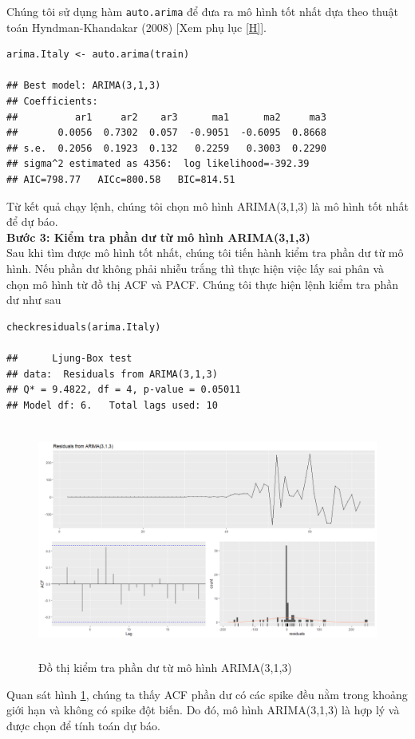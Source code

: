 \documentclass[12pt, a4paper,oneside]{book}
\theoremstyle{definition}
\begin{document}
Chúng tôi sử dụng hàm \lstinline{auto.arima} để đưa ra mô hình tốt nhất dựa theo thuật toán Hyndman-Khandakar (2008) [Xem phụ lục \ref{H}].
\begin{lstlisting}
arima.Italy <- auto.arima(train)

## Best model: ARIMA(3,1,3) 
## Coefficients:
##          ar1     ar2    ar3      ma1      ma2     ma3
##       0.0056  0.7302  0.057  -0.9051  -0.6095  0.8668
## s.e.  0.2056  0.1923  0.132   0.2259   0.3003  0.2290
## sigma^2 estimated as 4356:  log likelihood=-392.39
## AIC=798.77   AICc=800.58   BIC=814.51
\end{lstlisting}
Từ kết quả chạy lệnh, chúng tôi chọn mô hình ARIMA(3,1,3) là mô hình tốt nhất để dự báo.\\
\textbf{Bước 3: Kiểm tra phần dư từ mô hình ARIMA(3,1,3)}\\
Sau khi tìm được mô hình tốt nhất, chúng tôi tiến hành kiểm tra phần dư từ mô hình. Nếu phần dư không phải nhiễu trắng thì thực hiện việc lấy sai phân và chọn mô hình từ đồ thị ACF và PACF. Chúng tôi thực hiện lệnh kiểm tra phần dư như sau\\ 
\begin{lstlisting}
checkresiduals(arima.Italy)

##  	Ljung-Box test
## data:  Residuals from ARIMA(3,1,3)
## Q* = 9.4822, df = 4, p-value = 0.05011
## Model df: 6.   Total lags used: 10
\end{lstlisting}
\begin{figure}[!htb]
	\centering
	\includegraphics[width=1\linewidth, height=7.7cm]{anh/PD1}
	\vskip-4mm 
	\caption{Đồ thị kiểm tra phần dư từ mô hình ARIMA(3,1,3)}  
	\label{PD1}
\end{figure}
Quan sát hình \ref{PD1}, chúng ta thấy ACF phần dư có các spike đều nằm trong khoảng giới hạn và không có spike đột biến. Do đó, mô hình ARIMA(3,1,3) là hợp lý và được chọn để tính toán dự báo.\\
\end{document}
